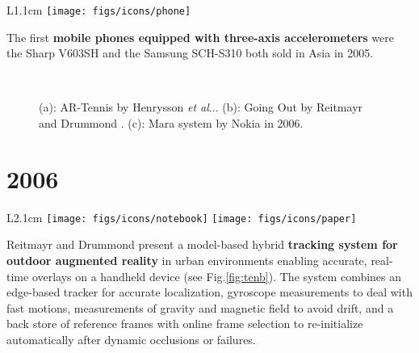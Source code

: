 \documentclass[12pt,a4paper]{article}
\makeatletter
\DeclareRobustCommand\onedot{\futurelet\@let@token\@onedot}
\def\@onedot{\ifx\@let@token.\else.\null\fi\xspace}
\def\etal{\emph{et al}\onedot}
\makeatother
\begin{document}
\vspace{0.1in}

\begin{wrapfigure}{L}{1.1cm}
	\vspace{-0pt}	
	\texttt{[image: figs/icons/phone]}
	\vspace{-20pt}		
\end{wrapfigure}
\noindent The first \textbf{mobile phones equipped with three-axis accelerometers} were the Sharp V603SH and the Samsung SCH-S310 both sold in Asia in 2005. 

\begin{figure}[tbp]
\centering
\vspace{-0pt}
 \hfill
{} \hfill 
{} \\
\vspace{-10pt}
\caption{(a): AR-Tennis by Henrysson \etal \cite{Henrysson05}. (b): Going Out by Reitmayr and Drummond \cite{Reitmayr06}. (c): Mara system by Nokia in 2006.} \label{fig:ten}
\end{figure}

\vspace{-5pt} 
\section*{2006}

\begin{wrapfigure}{L}{2.1cm}
	\vspace{-10pt}	
	\texttt{[image: figs/icons/notebook]}
	\texttt{[image: figs/icons/paper]}	
	\vspace{-20pt}		
\end{wrapfigure}
Reitmayr and Drummond present a model-based hybrid \textbf{tracking system for outdoor augmented reality} in urban environments enabling accurate, real-time overlays on a handheld device \cite{Reitmayr06} (see Fig.\ref{fig:tenb}). The system combines an edge-based tracker for accurate localization, gyroscope measurements to deal with fast motions, measurements of gravity and magnetic field to avoid drift, and a back store of reference frames with online frame selection to re-initialize automatically after dynamic occlusions or failures.

\vspace{0.1in} 
\end{document}

